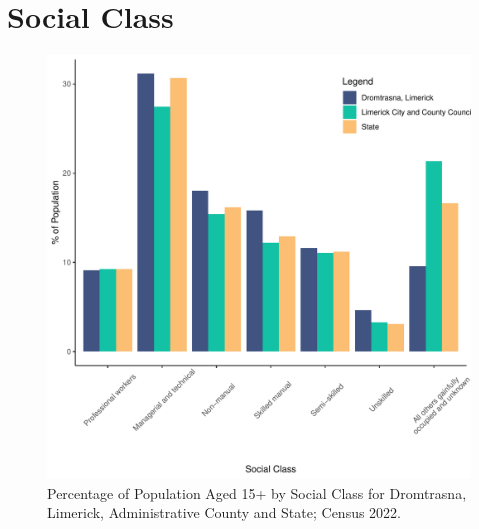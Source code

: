 \documentclass{article}
\begin{document}
\section{Social Class}\label{sect:SC}
\begin{figure}[H]
	\centering
	\includegraphics[width = 140mm]{../figures/SocialClassED.pdf}
	\caption{Percentage of Population Aged 15+ by Social Class for Dromtrasna, Limerick, Administrative County and State; Census 2022.}
	\label{fig:vbnv}
	\end{figure}
\end{document}
